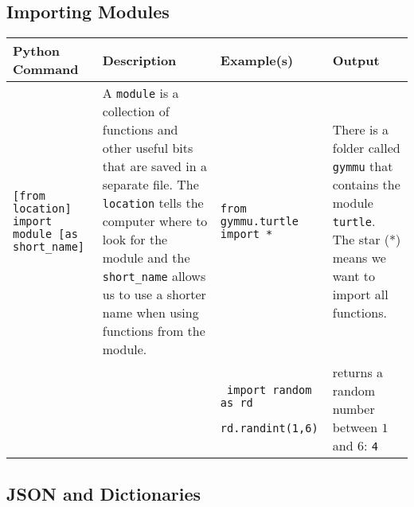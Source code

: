 \documentclass[11pt,a4paper]{report}
\begin{document}
\subsection{Importing Modules}

\begin{longtable}{|p{}|p{}|p{}|p{}|}
\hline
Python Command & Description & Example(s) & Output  \\
\hline 
\endhead
\lstinline|[from location] import module [as short_name]| & A \verb|module| is a collection of functions and other useful bits that are saved in a separate file. The \verb|location| tells the computer where to look for the module and the \verb|short_name| allows us to use a shorter name when using functions from the module. & \lstinline|from gymmu.turtle import *| & There is a folder called \verb|gymmu| that contains the module \verb|turtle|. The star (*) means we want to import all functions. \\
\hline
 && \begin{lstlisting}
 import random as rd
 rd.randint(1,6)
 \end{lstlisting}
 & returns a random number between $1$ and $6$: \newline
 \verb|4| \\
 \hline
\end{longtable}


\subsection{JSON and Dictionaries}
\end{document}
